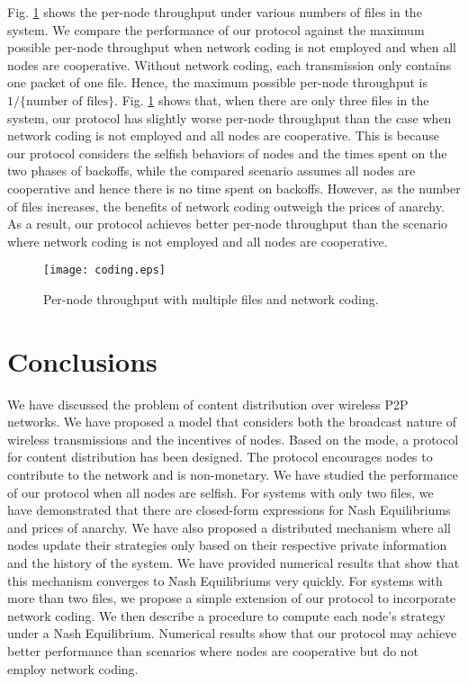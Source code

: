 \documentclass[11pt, conference]{IEEEtran}
\def\baselinestretch{0.83}
\begin{document}
Fig. \ref{fig:numerical:coding} shows the per-node throughput under various numbers of files in the system. We compare the performance of our protocol against the maximum possible per-node throughput when network coding is not employed and when all nodes are cooperative. Without network coding, each transmission only contains one packet of one file. Hence, the maximum possible per-node throughput is $1/\{\mbox{number of files}\}$. Fig. \ref{fig:numerical:coding} shows that, when there are only three files in the system, our protocol has slightly worse per-node throughput than the case when network coding is not employed and all nodes are cooperative. This is because our protocol considers the selfish behaviors of nodes and the times spent on the two phases of backoffs, while the compared scenario assumes all nodes are cooperative and hence there is no time spent on backoffs. However, as the number of files increases, the benefits of network coding outweigh the prices of anarchy. As a result, our protocol achieves better per-node throughput than the scenario where network coding is not employed and all nodes are cooperative.

\begin{figure}[t]
\texttt{[image: coding.eps]}
\caption{Per-node throughput with multiple files and network coding.} \label{fig:numerical:coding}
\end{figure}


\section{Conclusions}   \label{section:conclusion}

We have discussed the problem of content distribution over wireless P2P networks. We have proposed a model that considers both the broadcast nature of wireless transmissions and the incentives of nodes. Based on the mode, a protocol for content distribution has been designed. The protocol encourages nodes to contribute to the network and is non-monetary. We have studied the performance of our protocol when all nodes are selfish. For systems with only two files, we have demonstrated that there are closed-form expressions for Nash Equilibriums and prices of anarchy. We have also proposed a distributed mechanism where all nodes update their strategies only based on their respective private information and the history of the system. We have provided numerical results that show that this mechanism converges to Nash Equilibriums very quickly. For systems with more than two files, we propose a simple extension of our protocol to incorporate network coding. We then describe a procedure to compute each node's strategy under a Nash Equilibrium. Numerical results show that our protocol may achieve better performance than scenarios where nodes are cooperative but do not employ network coding.



\def\baselinestretch{0.85}
\small


\end{document}
